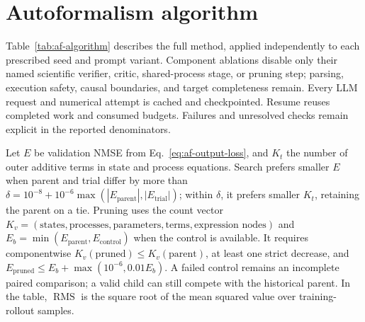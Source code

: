 \section{Autoformalism algorithm}
\label{app:af-algorithm}

Table~\ref{tab:af-algorithm} describes the full method, applied independently
to each prescribed seed and prompt variant. Component ablations disable only
their named scientific verifier, critic, shared-process stage, or pruning step;
parsing, execution safety, causal boundaries, and target completeness remain.
Every LLM request and numerical attempt is cached and checkpointed. Resume
reuses completed work and consumed budgets. Failures and unresolved checks
remain explicit in the reported denominators.

Let $E$ be validation NMSE from Eq.~\eqref{eq:af-output-loss}, and $K_t$ the
number of outer additive terms in state and process equations. Search prefers
smaller $E$ when parent and trial differ by more than
$\delta=10^{-8}+10^{-6}\max(|E_{\mathrm{parent}}|,|E_{\mathrm{trial}}|)$;
within $\delta$, it prefers smaller $K_t$, retaining the parent on a tie.
Pruning uses the count vector
$K_v=(\text{states},\text{processes},\text{parameters},\text{terms},
\text{expression nodes})$ and $E_b=\min(E_{\mathrm{parent}},E_{\mathrm{control}})$
when the control is available. It requires componentwise
$K_v(\mathrm{pruned})\le K_v(\mathrm{parent})$, at least one strict decrease,
and $E_{\mathrm{pruned}}\le E_b+\max(10^{-6},0.01E_b)$.
A failed control remains an incomplete paired comparison; a valid child can
still compete with the historical parent. In the table, $\operatorname{RMS}$
is the square root of the mean squared value over training-rollout samples.

